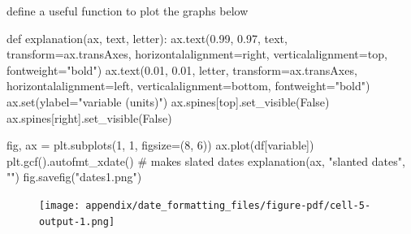 \documentclass[
  letterpaper,
  DIV=11,
  numbers=noendperiod]{scrreprt}
\newenvironment{Shaded}{\begin{snugshade}}{\end{snugshade}}
\newcommand{\BuiltInTok}[1]{\textcolor[rgb]{0.00,0.23,0.31}{#1}}
\newcommand{\CommentTok}[1]{\textcolor[rgb]{0.37,0.37,0.37}{#1}}
\newcommand{\DecValTok}[1]{\textcolor[rgb]{0.68,0.00,0.00}{#1}}
\newcommand{\FloatTok}[1]{\textcolor[rgb]{0.68,0.00,0.00}{#1}}
\newcommand{\KeywordTok}[1]{\textcolor[rgb]{0.00,0.23,0.31}{#1}}
\newcommand{\NormalTok}[1]{\textcolor[rgb]{0.00,0.23,0.31}{#1}}
\newcommand{\OperatorTok}[1]{\textcolor[rgb]{0.37,0.37,0.37}{#1}}
\newcommand{\StringTok}[1]{\textcolor[rgb]{0.13,0.47,0.30}{#1}}
\newcommand{\VariableTok}[1]{\textcolor[rgb]{0.07,0.07,0.07}{#1}}
\begin{document}
define a useful function to plot the graphs below

\begin{Shaded}
\begin{Highlighting}[]
\KeywordTok{def}\NormalTok{ explanation(ax, text, letter):}
\NormalTok{    ax.text(}\FloatTok{0.99}\NormalTok{, }\FloatTok{0.97}\NormalTok{, text,}
\NormalTok{            transform}\OperatorTok{=}\NormalTok{ax.transAxes,}
\NormalTok{            horizontalalignment}\OperatorTok{=}\StringTok{\textquotesingle{}right\textquotesingle{}}\NormalTok{, verticalalignment}\OperatorTok{=}\StringTok{\textquotesingle{}top\textquotesingle{}}\NormalTok{,}
\NormalTok{            fontweight}\OperatorTok{=}\StringTok{"bold"}\NormalTok{)}
\NormalTok{    ax.text(}\FloatTok{0.01}\NormalTok{, }\FloatTok{0.01}\NormalTok{, letter,}
\NormalTok{            transform}\OperatorTok{=}\NormalTok{ax.transAxes,}
\NormalTok{            horizontalalignment}\OperatorTok{=}\StringTok{\textquotesingle{}left\textquotesingle{}}\NormalTok{, verticalalignment}\OperatorTok{=}\StringTok{\textquotesingle{}bottom\textquotesingle{}}\NormalTok{,}
\NormalTok{            fontweight}\OperatorTok{=}\StringTok{"bold"}\NormalTok{)}
\NormalTok{    ax.}\BuiltInTok{set}\NormalTok{(ylabel}\OperatorTok{=}\StringTok{"variable (units)"}\NormalTok{)}
\NormalTok{    ax.spines[}\StringTok{\textquotesingle{}top\textquotesingle{}}\NormalTok{].set\_visible(}\VariableTok{False}\NormalTok{)}
\NormalTok{    ax.spines[}\StringTok{\textquotesingle{}right\textquotesingle{}}\NormalTok{].set\_visible(}\VariableTok{False}\NormalTok{)}
\end{Highlighting}
\end{Shaded}

\begin{Shaded}
\begin{Highlighting}[]
\NormalTok{fig, ax }\OperatorTok{=}\NormalTok{ plt.subplots(}\DecValTok{1}\NormalTok{, }\DecValTok{1}\NormalTok{, figsize}\OperatorTok{=}\NormalTok{(}\DecValTok{8}\NormalTok{, }\DecValTok{6}\NormalTok{))}
\NormalTok{ax.plot(df[}\StringTok{\textquotesingle{}variable\textquotesingle{}}\NormalTok{])}
\NormalTok{plt.gcf().autofmt\_xdate()  }\CommentTok{\# makes slated dates}
\NormalTok{explanation(ax, }\StringTok{"slanted dates"}\NormalTok{, }\StringTok{""}\NormalTok{)}
\NormalTok{fig.savefig(}\StringTok{"dates1.png"}\NormalTok{)}
\end{Highlighting}
\end{Shaded}

\begin{figure}[H]

{\centering \texttt{[image: appendix/date\_formatting\_files/figure-pdf/cell-5-output-1.png]}

}

\end{figure}
\end{document}
